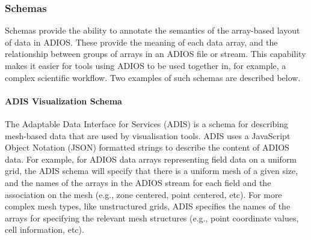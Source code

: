 \subsubsection{Schemas}
Schemas provide the ability to annotate the semantics of the array-based layout of data in ADIOS.
These provide the meaning of each data array, and the relationship between groups of arrays in an ADIOS file or stream. 
This capability makes it easier for tools using ADIOS to be used together in, for example, a complex scientific workflow.
Two examples of such schemas are described below.

\paragraph{\textbf{ADIS Visualization Schema}}


The Adaptable Data Interface for Services (ADIS) is a schema for describing mesh-based data that are used by visualisation tools. ADIS uses a JavaScript Object Notation (JSON) formatted strings to describe the content of ADIOS data. For example, for ADIOS data arrays representing field data on a uniform grid, the ADIS schema will specify that there is a uniform mesh of a given size, and the names of the arrays in the ADIOS stream for each field and the association on the mesh (e.g., zone centered, point centered, etc).
For more complex mesh types, like unstructured grids, ADIS specifies the names of the arrays for specifying the relevant mesh structures (e.g., point  coordinate values, cell information, etc).

